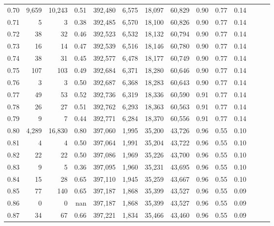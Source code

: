 \begin{tabular}{rrrrrrrrrrrrrr}
0.70 &   9,659 &  10,243 &  0.51 &  392,480 &    6,575 &  18,097 &  60,829 &  0.90 &  0.77 &      0.14 \\
0.71 &       5 &       3 &  0.38 &  392,485 &    6,570 &  18,100 &  60,826 &  0.90 &  0.77 &      0.14 \\
0.72 &      38 &      32 &  0.46 &  392,523 &    6,532 &  18,132 &  60,794 &  0.90 &  0.77 &      0.14 \\
0.73 &      16 &      14 &  0.47 &  392,539 &    6,516 &  18,146 &  60,780 &  0.90 &  0.77 &      0.14 \\
0.74 &      38 &      31 &  0.45 &  392,577 &    6,478 &  18,177 &  60,749 &  0.90 &  0.77 &      0.14 \\
0.75 &     107 &     103 &  0.49 &  392,684 &    6,371 &  18,280 &  60,646 &  0.90 &  0.77 &      0.14 \\
0.76 &       3 &       3 &  0.50 &  392,687 &    6,368 &  18,283 &  60,643 &  0.90 &  0.77 &      0.14 \\
0.77 &      49 &      53 &  0.52 &  392,736 &    6,319 &  18,336 &  60,590 &  0.91 &  0.77 &      0.14 \\
0.78 &      26 &      27 &  0.51 &  392,762 &    6,293 &  18,363 &  60,563 &  0.91 &  0.77 &      0.14 \\
0.79 &       9 &       7 &  0.44 &  392,771 &    6,284 &  18,370 &  60,556 &  0.91 &  0.77 &      0.14 \\
0.80 &   4,289 &  16,830 &  0.80 &  397,060 &    1,995 &  35,200 &  43,726 &  0.96 &  0.55 &      0.10 \\
0.81 &       4 &       4 &  0.50 &  397,064 &    1,991 &  35,204 &  43,722 &  0.96 &  0.55 &      0.10 \\
0.82 &      22 &      22 &  0.50 &  397,086 &    1,969 &  35,226 &  43,700 &  0.96 &  0.55 &      0.10 \\
0.83 &       9 &       5 &  0.36 &  397,095 &    1,960 &  35,231 &  43,695 &  0.96 &  0.55 &      0.10 \\
0.84 &      15 &      28 &  0.65 &  397,110 &    1,945 &  35,259 &  43,667 &  0.96 &  0.55 &      0.10 \\
0.85 &      77 &     140 &  0.65 &  397,187 &    1,868 &  35,399 &  43,527 &  0.96 &  0.55 &      0.09 \\
0.86 &       0 &       0 &   nan &  397,187 &    1,868 &  35,399 &  43,527 &  0.96 &  0.55 &      0.09 \\
0.87 &      34 &      67 &  0.66 &  397,221 &    1,834 &  35,466 &  43,460 &  0.96 &  0.55 &      0.09 \\

\end{tabular}
